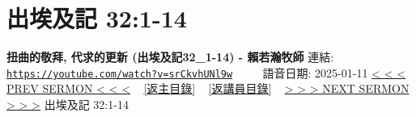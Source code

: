 \documentclass{book}
\begin{document}
\section{出埃及記 32:1-14}
\label{sec:srCkvhUNl9w}
\textbf{扭曲的敬拜, 代求的更新 (出埃及記32\_1-14) -  賴若瀚牧師}
\newline
\newline
連結: \href{https://youtube.com/watch?v=srCkvhUNl9w}{\texttt{https://youtube.com/watch?v=srCkvhUNl9w}} ~~~~ 語音日期: 2025-01-11
\newline
\newline
\hyperref[sec:yRzXvTTOZfM]{< < < PREV SERMON < < <}
~
\hyperlink{toc}{[返主目錄]}
~
\hyperref[ch:preacher13]{[返講員目錄]}
~
\hyperref[sec:4994BMikpLI]{> > > NEXT SERMON > > >}
\newline
\newline
出埃及記 32:1-14
\newline
\end{document}
